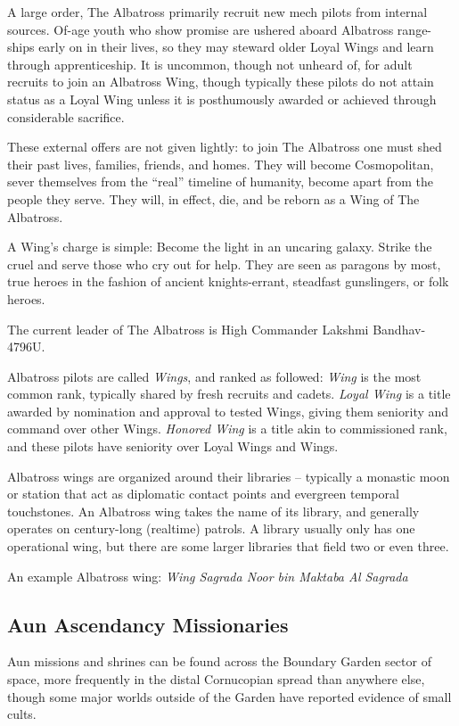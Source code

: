 A large order, The Albatross primarily recruit new mech pilots from internal
sources. Of-age youth who show promise are ushered aboard Albatross range-ships
early on in their lives, so they may steward older Loyal Wings and learn through
apprenticeship. It is uncommon, though not unheard of, for adult recruits to
join an Albatross Wing, though typically these pilots do not attain status as a
Loyal Wing unless it is posthumously awarded or achieved through considerable
sacrifice.

These external offers are not given lightly: to join The Albatross one must shed
their past lives, families, friends, and homes. They will become Cosmopolitan,
sever themselves from the “real” timeline of humanity, become apart from the
people they serve. They will, in effect, die, and be reborn as a Wing of The
Albatross.

A Wing’s charge is simple: Become the light in an uncaring galaxy. Strike the
cruel and serve those who cry out for help. They are seen as paragons by most,
true heroes in the fashion of ancient knights-errant, steadfast gunslingers, or
folk heroes.

The current leader of The Albatross is High Commander Lakshmi Bandhav-4796U.

Albatross pilots are called \textit{Wings}, and ranked as followed: \textit{Wing} is the most
common rank, typically shared by fresh recruits and cadets. \textit{Loyal Wing} is a
title awarded by nomination and approval to tested Wings, giving them seniority
and command over other Wings. \textit{Honored Wing} is a title akin to commissioned rank,
and these pilots have seniority over Loyal Wings and Wings.

Albatross wings are organized around their libraries -- typically a monastic
moon or station that act as diplomatic contact points and evergreen temporal
touchstones. An Albatross wing takes the name of its library, and generally
operates on century-long (realtime) patrols. A library usually only has one
operational wing, but there are some larger libraries that field two or even
three.

An example Albatross wing: \textit{Wing Sagrada Noor bin Maktaba Al Sagrada}

\subsection{Aun Ascendancy Missionaries}

Aun missions and shrines can be found across the Boundary Garden sector of space, more
frequently in the distal Cornucopian spread than anywhere else, though some major worlds
outside of the Garden have reported evidence of small cults.

